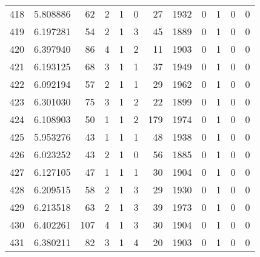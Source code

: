 \begin{tabular}{lrrrrrrrrrrr}
418 &  5.808886 &   62 &      2 &        1 &      0 &              27 &  1932 &               0 &               1 &               0 &               0 \\
419 &  6.197281 &   54 &      2 &        1 &      3 &              45 &  1889 &               0 &               1 &               0 &               0 \\
420 &  6.397940 &   86 &      4 &        1 &      2 &              11 &  1903 &               0 &               1 &               0 &               0 \\
421 &  6.193125 &   68 &      3 &        1 &      1 &              37 &  1949 &               0 &               1 &               0 &               0 \\
422 &  6.092194 &   57 &      2 &        1 &      1 &              29 &  1962 &               0 &               1 &               0 &               0 \\
423 &  6.301030 &   75 &      3 &        1 &      2 &              22 &  1899 &               0 &               1 &               0 &               0 \\
424 &  6.108903 &   50 &      1 &        1 &      2 &             179 &  1974 &               0 &               1 &               0 &               0 \\
425 &  5.953276 &   43 &      1 &        1 &      1 &              48 &  1938 &               0 &               1 &               0 &               0 \\
426 &  6.023252 &   43 &      2 &        1 &      0 &              56 &  1885 &               0 &               1 &               0 &               0 \\
427 &  6.127105 &   47 &      1 &        1 &      1 &              30 &  1904 &               0 &               1 &               0 &               0 \\
428 &  6.209515 &   58 &      2 &        1 &      3 &              29 &  1930 &               0 &               1 &               0 &               0 \\
429 &  6.213518 &   63 &      2 &        1 &      3 &              39 &  1973 &               0 &               1 &               0 &               0 \\
430 &  6.402261 &  107 &      4 &        1 &      3 &              30 &  1904 &               0 &               1 &               0 &               0 \\
431 &  6.380211 &   82 &      3 &        1 &      4 &              20 &  1903 &               0 &               1 &               0 &               0 \\

\end{tabular}
